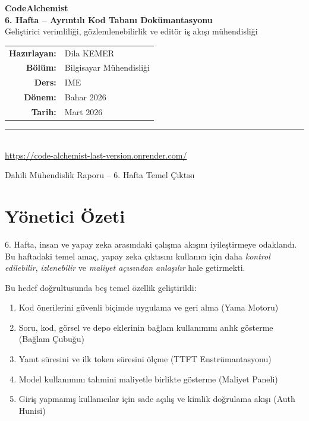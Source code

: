 \documentclass[12pt,a4paper]{article}
\begin{document}
\begin{titlepage}
  \centering
  \vspace*{1.8cm}

  {\Huge\bfseries\color{keywordblue} CodeAlchemist}\\[0.8em]
  {\LARGE\bfseries 6. Hafta -- Ayrıntılı Kod Tabanı Dokümantasyonu}\\[1.1em]
  {\large Geliştirici verimliliği, gözlemlenebilirlik ve editör iş akışı mühendisliği}

  \vspace{2.2cm}

  \begin{tabular}{rl}
    \textbf{Hazırlayan:} & Dila KEMER \\
    \textbf{Bölüm:}      & Bilgisayar Mühendisliği \\
    \textbf{Ders:}        & IME \\
    \textbf{Dönem:}       & Bahar 2026 \\
    \textbf{Tarih:}       & Mart 2026
  \end{tabular}

  \vspace{2cm}
  \rule{0.85\textwidth}{0.5pt}\\[0.6em]
  \href{https://code-alchemist-last-version.onrender.com/}{https://code-alchemist-last-version.onrender.com/}

  \vfill
  {\small Dahili Mühendislik Raporu -- 6. Hafta Temel Çıktısı}
\end{titlepage}

\tableofcontents
\newpage

\section*{Yönetici Özeti}

6. Hafta, insan ve yapay zeka arasındaki çalışma akışını iyileştirmeye odaklandı. Bu haftadaki temel amaç, yapay zeka çıktısını kullanıcı için daha \textit{kontrol edilebilir}, \textit{izlenebilir} ve \textit{maliyet açısından anlaşılır} hale getirmekti.

Bu hedef doğrultusunda beş temel özellik geliştirildi:
\begin{enumerate}[leftmargin=*]
  \item Kod önerilerini güvenli biçimde uygulama ve geri alma (Yama Motoru)
  \item Soru, kod, görsel ve depo eklerinin bağlam kullanımını anlık gösterme (Bağlam Çubuğu)
  \item Yanıt süresini ve ilk token süresini ölçme (TTFT Enstrümantasyonu)
  \item Model kullanımını tahmini maliyetle birlikte gösterme (Maliyet Paneli)
  \item Giriş yapmamış kullanıcılar için sade açılış ve kimlik doğrulama akışı (Auth Hunisi)
\end{enumerate}
\end{document}
